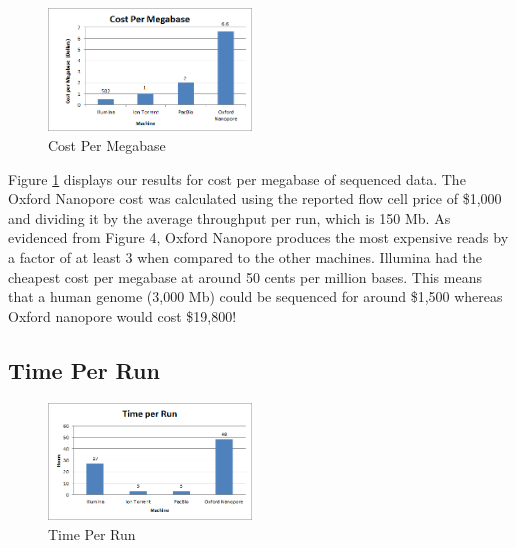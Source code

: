 \documentclass[12pt,letterpaper]{report}
\begin{document}
\begin{figure}
\vspace{-20pt}
  \begin{center}
    \includegraphics[width=0.48\textwidth]{cost_per_megabase.png}
  \end{center}
  \vspace{-20pt}
  \caption{Cost Per Megabase}
  \vspace{-10pt}
  \label{fig:cost_per_megabase}
\end{figure}

Figure \ref{fig:cost_per_megabase} displays our results for cost per megabase of sequenced data. The Oxford Nanopore cost was calculated using the reported flow cell price of \$1,000 and dividing it by the average throughput per run, which is 150 Mb. As evidenced from Figure 4, Oxford Nanopore produces the most expensive reads by a factor of at least 3 when compared to the other machines. Illumina had the cheapest cost per megabase at around 50 cents per million bases. This means that a human genome (3,000 Mb) could be sequenced for around \$1,500 whereas Oxford nanopore would cost \$19,800!


\subsection{Time Per Run}

\begin{figure}
  \vspace{-20pt}
  \begin{center}
    \includegraphics[width=0.48\textwidth]{time_per_run.png}
  \end{center}
  \vspace{-20pt}
  \caption{Time Per Run}
  \vspace{-10pt}
  \label{fig:time_per_run}
\end{figure}
\end{document}
